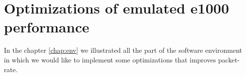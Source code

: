 \chapter{Optimizations of emulated e1000 performance}
In the chapter \ref{chap:env} we illustrated all the part of the software environment in which we would like to implement 
some optimizations that improves packet-rate.

